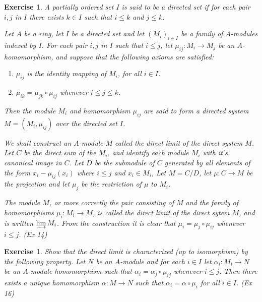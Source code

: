 \documentclass[]{report}
\newtheorem{exercise}[theorem]{Exercise}
\begin{document}
\begin{exercise}
    A partially ordered set $I$ is said to be a directed set if for each pair $i, j$ in $I$ there exists $k\in I$ such that $i\leq k$ and $j\leq k$. 

    Let $A$ be a ring, let $I$ be a directed set and let $(M_i)_{i\in I}$ be a family of $A$-modules indexed by $I$. For each pair $i,j$ in $I$ such that $i\leq j$, let $\mu_{ij}: M_i \rightarrow M_j$ be an $A$-homomorphism, and suppose that the following axioms are satisfied:
    \begin{enumerate}
        \item $\mu_{ij}$ is the identity mapping of $M_i$, for all $i\in I$.
        \item $\mu_{ik} = \mu_{jk} \circ \mu_{ij}$ whenever $i\leq j\leq k$.
    \end{enumerate}

    Then the module $M_i$ and homomorphism $\mu_{ij}$ are said to form a directed system  $M = (M_i, \mu_{ij})$ over the directed set $I$. 

    We shall construct an $A$-module $M$ called the direct limit of the direct system $M$. Let $C$ be the direct sum of the $M_i$, and identify each module $M_i$ with it's canonical image in $C$. Let $D$ be the submodule of $C$ generated by all elements of the form $x_i-\mu_{ij}(x_i)$ where $i\leq j$ and $x_i\in M_i$, Let $M= C/D$, let $\mu: C \rightarrow M$ be the projection and let $\mu_j$ be the restriction of $\mu$ to $M_i$. 

    The module $M$, or more correctly the pair consisting of $M$ and the family of homomorphisms $\mu_i: M_i \rightarrow M$, is called the direct limit of the direct sytem $M$, and is written $\varinjlim M_i$. From the construction it is clear that $\mu_i = \mu_j \circ \mu_{ij}$ whenever $i\leq j$.
    (Ex 14)
\end{exercise}

\begin{exercise}
    Show that the direct limit is characterized (up to isomorphism) by the following property. Let $N$ be an $A$-module and for each $i\in I$ let $\alpha_i: M_i\rightarrow N$ be an $A$-module homomorphism such that $\alpha_i = \alpha_j \circ \mu_{ij}$ whenever $i\leq j$. Then there exists a unique homomorphism $\alpha: M\rightarrow N$ such that $\alpha_i = \alpha \circ \mu_i$ for all $i\in I$.
    (Ex 16)
\end{exercise}

\end{document}
